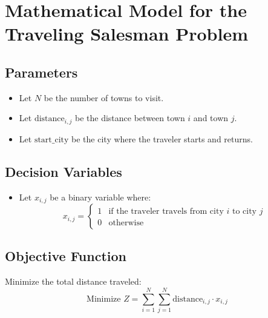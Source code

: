 \documentclass{article}
\begin{document}
\section*{Mathematical Model for the Traveling Salesman Problem}

\subsection*{Parameters}
\begin{itemize}
    \item Let \( N \) be the number of towns to visit.
    \item Let \( \text{distance}_{i,j} \) be the distance between town \( i \) and town \( j \).
    \item Let \( \text{start\_city} \) be the city where the traveler starts and returns.
\end{itemize}

\subsection*{Decision Variables}
\begin{itemize}
    \item Let \( x_{i,j} \) be a binary variable where:
    \[
    x_{i,j} =
    \begin{cases}
    1 & \text{if the traveler travels from city } i \text{ to city } j \\
    0 & \text{otherwise}
    \end{cases}
    \]
\end{itemize}

\subsection*{Objective Function}
Minimize the total distance traveled:
\[
\text{Minimize } Z = \sum_{i=1}^{N} \sum_{j=1}^{N} \text{distance}_{i,j} \cdot x_{i,j}
\]
\end{document}
